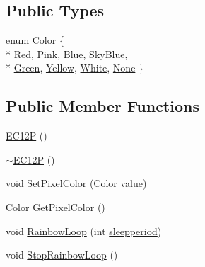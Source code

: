 \subsection*{Public Types}
\begin{DoxyCompactItemize}
\item 
enum \hyperlink{class_hardware_1_1_e_c12_p_a8341f410cd939bf03160fe239bc782aa}{Color} \{ \\*
\hyperlink{class_hardware_1_1_e_c12_p_a8341f410cd939bf03160fe239bc782aaa3b57c8754eb52c7023d81c7c45687f05}{Red}, 
\hyperlink{class_hardware_1_1_e_c12_p_a8341f410cd939bf03160fe239bc782aaab5841c141282166e57407746841ff248}{Pink}, 
\hyperlink{class_hardware_1_1_e_c12_p_a8341f410cd939bf03160fe239bc782aaa3f67a6d3b6004f86b8e4a477b3c5f915}{Blue}, 
\hyperlink{class_hardware_1_1_e_c12_p_a8341f410cd939bf03160fe239bc782aaaac948b76451e5914627c3b482c5054c4}{Sky\+Blue}, 
\\*
\hyperlink{class_hardware_1_1_e_c12_p_a8341f410cd939bf03160fe239bc782aaafaadad2fea189e40df690d3bde44ac28}{Green}, 
\hyperlink{class_hardware_1_1_e_c12_p_a8341f410cd939bf03160fe239bc782aaa25b4723962c85776a4ce70b8eee81263}{Yellow}, 
\hyperlink{class_hardware_1_1_e_c12_p_a8341f410cd939bf03160fe239bc782aaacd1663fa4d06aa68eca32bbf370d9e15}{White}, 
\hyperlink{class_hardware_1_1_e_c12_p_a8341f410cd939bf03160fe239bc782aaa0a40adb50c361b3ee3a6faca241d7c7a}{None}
 \}
\end{DoxyCompactItemize}
\subsection*{Public Member Functions}
\begin{DoxyCompactItemize}
\item 
\hyperlink{class_hardware_1_1_e_c12_p_a0b5c45d061ad98239e816e3845535d15}{E\+C12\+P} ()
\item 
\hyperlink{class_hardware_1_1_e_c12_p_a22ea7087bba0f459caed9f2fb6cd7412}{$\sim$\+E\+C12\+P} ()
\item 
void \hyperlink{class_hardware_1_1_e_c12_p_a9ef5c813c9eb38db1c236d1be0d23911}{Set\+Pixel\+Color} (\hyperlink{class_hardware_1_1_e_c12_p_a8341f410cd939bf03160fe239bc782aa}{Color} value)
\item 
\hyperlink{class_hardware_1_1_e_c12_p_a8341f410cd939bf03160fe239bc782aa}{Color} \hyperlink{class_hardware_1_1_e_c12_p_adc2a46fdee1bbec702761787a5a6a95b}{Get\+Pixel\+Color} ()
\item 
void \hyperlink{class_hardware_1_1_e_c12_p_aa2247dfecd78d1a384b1ba1d6e8d62e8}{Rainbow\+Loop} (int \hyperlink{class_hardware_1_1_e_c12_p_adff7ed51fd97bac61075c88a06102348}{sleepperiod})
\item 
void \hyperlink{class_hardware_1_1_e_c12_p_acc39f96105144c8aa5fca04942832987}{Stop\+Rainbow\+Loop} ()
\end{DoxyCompactItemize}
